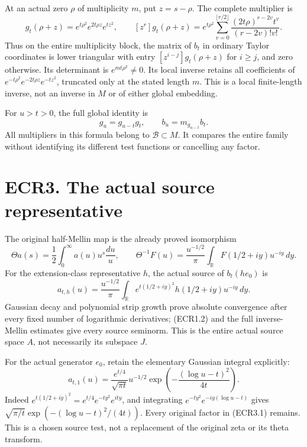 At an actual zero \(\rho\) of multiplicity \(m\), put \(z=s-\rho\). The
complete multiplier is \[
g_t(\rho+z)=e^{t\rho^2}e^{2t\rho z}e^{tz^2},
\qquad
[z^r]g_t(\rho+z)
=e^{t\rho^2}\sum_{v=0}^{\lfloor r/2\rfloor}
\frac{(2t\rho)^{r-2v}t^v}{(r-2v)!v!}.
\tag{ECR2.1}
\] Thus on the entire multiplicity block, the matrix of \(b_t\) in
ordinary Taylor coordinates is lower triangular with entry
\([z^{i-j}]g_t(\rho+z)\) for \(i\ge j\), and zero otherwise. Its
determinant is \(e^{mt\rho^2}\ne0\). Its local inverse retains all
coefficients of \(e^{-t\rho^2}e^{-2t\rho z}e^{-tz^2}\), truncated only
at the stated length \(m\). This is a local finite-length inverse, not
an inverse in \(M\) or of either global embedding.

For \(u>t>0\), the full global identity is \[
g_u=g_{u-t}g_t,\qquad b_u=m_{g_{u-t}}b_t.
\tag{ECR2.2}
\] All multipliers in this formula belong to \(\mathcal B\subset M\). It
compares the entire family without identifying its different test
functions or cancelling any factor.

\section{ECR3. The actual source
representative}\label{ecr3.-the-actual-source-representative}

The original half-Mellin map is the already proved isomorphism \[
\Theta a(s)=\frac12\int_0^\infty a(u)u^s\frac{du}{u},
\qquad
\Theta^{-1}F(u)=\frac{u^{-1/2}}\pi
\int_{\mathbb R}F(1/2+iy)u^{-iy}\,dy.
\tag{ECR3.1}
\] For the extension-class representative \(h\), the actual source of
\(b_t(h e_0)\) is \[
a_{t,h}(u)=\frac{u^{-1/2}}\pi
\int_{\mathbb R}e^{t(1/2+iy)^2}h(1/2+iy)u^{-iy}\,dy.
\tag{ECR3.2}
\] Gaussian decay and polynomial strip growth prove absolute convergence
after every fixed number of logarithmic derivatives; (ECR1.2) and the
full inverse-Mellin estimates give every source seminorm. This is the
entire actual source space \(A\), not necessarily its subspace \(J\).

For the actual generator \(e_0\), retain the elementary Gaussian
integral explicitly: \[
a_{t,1}(u)=\frac{e^{t/4}}{\sqrt{\pi t}}u^{-1/2}
\exp\!\left(-\frac{(\log u-t)^2}{4t}\right).
\tag{ECR3.3}
\] Indeed \(e^{t(1/2+iy)^2}=e^{t/4}e^{-ty^2}e^{ity}\), and integrating
\(e^{-ty^2}e^{-iy(\log u-t)}\) gives
\(\sqrt{\pi/t}\exp(- (\log u-t)^2/(4t))\). Every original factor in
(ECR3.1) remains. This is a chosen source test, not a replacement of the
original zeta or its theta transform.

